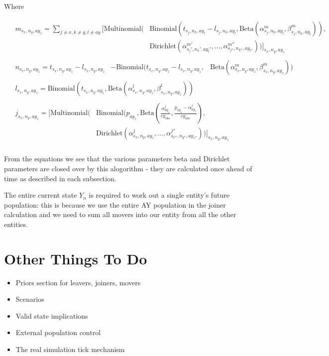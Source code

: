 \documentclass[margin=5mm]{article}
\begin{document}
Where

\begin{equation*}
\begin{aligned}
& \begin{split}
    m_{s_x,n_y,ay_z} = \sum_{j \neq x, k \neq y , l \neq ay }\bigg[
        \text{Multinomial}( & \text{Binomial}(t_{s_j,n_k,ay_l} - l_{s_j,n_k,ay_l}, 
        \text{Beta}(\alpha^m_{s_j,n_k,ay_l},\beta^m_{s_j,n_k,ay_l})),
        \\ &  \text{Dirichlet}(\alpha^{m'}_{s_j',n_k',ay_l'}, \dots,
        \alpha^{m''}_{s_{j''},n_{k''},ay_{l''}}))\bigg]_{s_x,n_y,ay_z}
\end{split}\\ 
& \begin{split}
    n_{s_x,n_y,ay_z} = t_{s_x,n_y,ay_z}  - l_{s_x,n_y,ay_z} & - \text{Binomial}(t_{s_x,n_y,ay_z} - l_{s_x,n_y,ay_z}, 
    & \text{Beta}(\alpha^m_{s_x,n_y,ay_z},\beta^m_{s_x,n_y,ay_z})) 
  \end{split}\\
& \begin{split}
  l_{s_x,n_y,ay_z} =
  \text{Binomial}(t_{s_x,n_y,ay_z},\text{Beta}(\alpha^l_{s_x,n_y,ay_z},
  \beta^l_{s_x,n_y,ay_z}))
\end{split}\\
& \begin{split}
j_{s_x,n_y,ay_z} = \bigg[\text{Multinomial}( & \text{Binomial}(p_{ay_z},
\text{Beta}(\frac{\alpha^j_{ay_z}}{cy_{obs}},\frac{p_{ay_z} -\alpha^j_{ay_z}}{cy_{obs}}), \\
& \text{Dirichlet}(\alpha^{j}_{s_x,n_y,ay_z}, \dots
, \alpha^{j''}_{s_{x''},n_{y''},ay_{z''}}))\bigg]_{s_x,n_y,ay_z}
\end{split}\\
\end{aligned}
\end{equation*}

From the equations we see that the various parameters beta and
Dirichlet parameters are closed over by this alogorithm - they are
calculated once ahead of time as described in each subsection.

The entire current state $Y_n$ is required to work out a single
entity's future population: this is because we use the entire AY
population in the joiner calculation and we need to sum all movers
into our entity from all the other entities.

\section{Other Things To Do}

\begin{itemize}
\item Priors section for leavers, joiners, movers
\item Scenarios
\item Valid state implications
\item External population control
\item The real simulation tick mechanism
\end{itemize}
\end{document}
